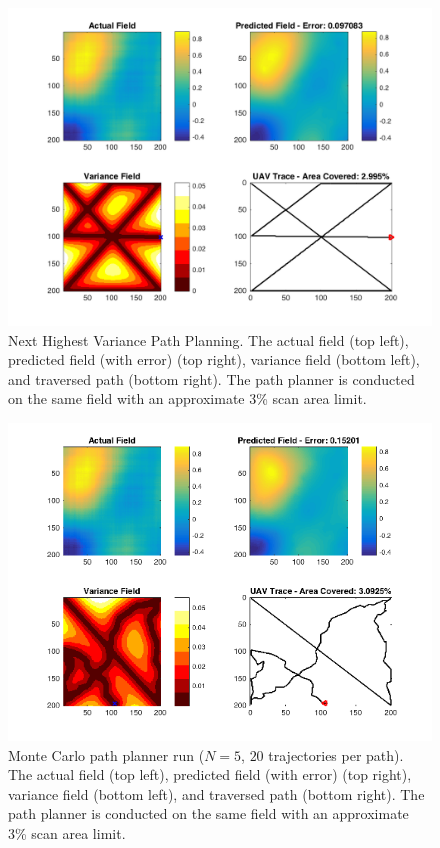 \begin{figure}[htb!]
    \centering
    \includegraphics[width=0.8\linewidth]{figures/nhv_200x200_10_percent.png}
	\captionsetup{skip=0.25\baselineskip,size=footnotesize}
	\caption{Next Highest Variance Path Planning. The actual field (top left), predicted field (with error) (top right), variance field (bottom left), and traversed path (bottom right). The path planner is conducted on the same field with an approximate 3\% scan area limit.}
\end{figure}
\begin{figure}[htb!]
    \centering
    \includegraphics[width=0.8\linewidth]{figures/mcpp_200x200_3_percent_mck_5_rands_20.png}
	\captionsetup{skip=0.25\baselineskip,size=footnotesize}
	\caption{Monte Carlo path planner run ($N=5$, $20$ trajectories per path). The actual field (top left), predicted field (with error) (top right), variance field (bottom left), and traversed path (bottom right). The path planner is conducted on the same field with an approximate 3\% scan area limit.}
\end{figure}
